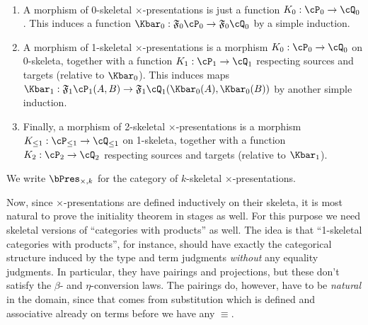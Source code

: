 \begin{defn}\ 
  \begin{enumerate}
  \item A morphism of 0-skeletal $\times$-presentations is just a function $K_0:\cP_0 \to \cQ_0$.
    This induces a function $\Kbar_0:\F{0}\cP_0 \to \F{0}\cQ_0$ by a simple induction.
  \item A morphism of 1-skeletal $\times$-presentations is a morphism $K_0:\cP_0 \to \cQ_0$ on 0-skeleta, together with a function $K_1:\cP_1 \to \cQ_1$ respecting sources and targets (relative to $\Kbar_0$).
    This induces maps $\Kbar_1 : \F{1}\cP_1(A,B) \to \F{1}\cQ_1(\Kbar_0(A),\Kbar_0(B))$ by another simple induction.
  \item Finally, a morphism of 2-skeletal $\times$-presentations is a morphism $K_{\le 1}:\cP_{\le 1} \to \cQ_{\le 1}$ on 1-skeleta, together with a function $K_2:\cP_2 \to \cQ_2$ respecting sources and targets (relative to $\Kbar_1$).
  \end{enumerate}
  We write $\timespres k$ for the category of $k$-skeletal $\times$-presentations.
\end{defn}

Now, since $\times$-presentations are defined inductively on their skeleta, it is most natural to prove the initiality theorem in stages as well.
For this purpose we need skeletal versions of ``categories with products'' as well.
The idea is that ``1-skeletal categories with products'', for instance, should have exactly the categorical structure induced by the type and term judgments \emph{without} any equality judgments.
In particular, they have pairings and projections, but these don't satisfy the $\beta$- and $\eta$-conversion laws.
The pairings do, however, have to be \emph{natural} in the domain, since that comes from substitution which is defined and associative already on terms before we have any $\equiv$.

